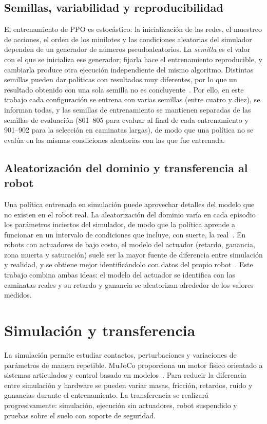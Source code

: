 \subsection{Semillas, variabilidad y reproducibilidad}

El entrenamiento de PPO es estocástico: la inicialización de las redes, el muestreo de acciones, el orden de los minilotes y las condiciones aleatorias del simulador dependen de un generador de números pseudoaleatorios. La \emph{semilla} es el valor con el que se inicializa ese generador; fijarla hace el entrenamiento reproducible, y cambiarla produce otra ejecución independiente del mismo algoritmo. Distintas semillas pueden dar políticas con resultados muy diferentes, por lo que un resultado obtenido con una sola semilla no es concluyente~\cite{henderson2018matters}. Por ello, en este trabajo cada configuración se entrena con varias semillas (entre cuatro y diez), se informan todas, y las semillas de entrenamiento se mantienen separadas de las semillas de evaluación (801--805 para evaluar al final de cada entrenamiento y 901--902 para la selección en caminatas largas), de modo que una política no se evalúa en las mismas condiciones aleatorias con las que fue entrenada.

\subsection{Aleatorización del dominio y transferencia al robot}

Una política entrenada en simulación puede aprovechar detalles del modelo que no existen en el robot real. La aleatorización del dominio varía en cada episodio los parámetros inciertos del simulador, de modo que la política aprende a funcionar en un intervalo de condiciones que incluye, con suerte, la real~\cite{tobin2017domain,tan2018simtoreal}. En robots con actuadores de bajo costo, el modelo del actuador (retardo, ganancia, zona muerta y saturación) suele ser la mayor fuente de diferencia entre simulación y realidad, y se obtiene mejor identificándolo con datos del propio robot~\cite{hwangbo2019anymal}. Este trabajo combina ambas ideas: el modelo del actuador se identifica con las caminatas reales y su retardo y ganancia se aleatorizan alrededor de los valores medidos.

\section{Simulación y transferencia}

La simulación permite estudiar contactos, perturbaciones y variaciones de parámetros de manera repetible. MuJoCo proporciona un motor físico orientado a sistemas articulados y control basado en modelos~\cite{todorov2012mujoco}. Para reducir la diferencia entre simulación y hardware se pueden variar masas, fricción, retardos, ruido y ganancias durante el entrenamiento. La transferencia se realizará progresivamente: simulación, ejecución sin actuadores, robot suspendido y pruebas sobre el suelo con soporte de seguridad.
